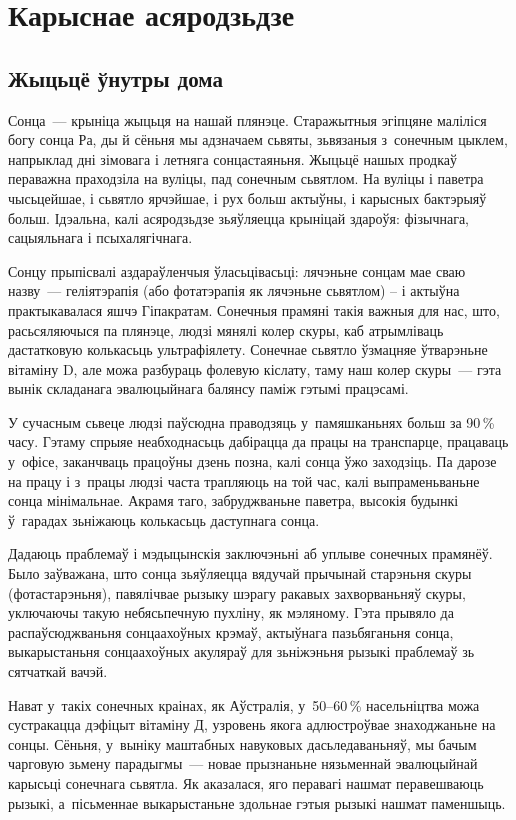 \chapter{Карыснае асяродзьдзе}

\section{Жыцьцё ўнутры дома}

Сонца~--- крыніца жыцьця на нашай плянэце. Старажытныя эгіпцяне маліліся богу сонца Ра, ды й сёньня мы адзначаем сьвяты, зьвязаныя з~сонечным цыклем, напрыклад дні зімовага і летняга сонцастаяньня. Жыцьцё нашых продкаў пераважна праходзіла на вуліцы, пад сонечным сьвятлом. На вуліцы і паветра чысьцейшае, і сьвятло ярчэйшае, і рух больш актыўны, і карысных бактэрыяў больш. Ідэальна, калі асяродзьдзе зьяўляецца крыніцай здароўя: фізычнага, сацыяльнага і псыхалягічнага.

Сонцу прыпісвалі аздараўленчыя ўласьцівасьці: лячэньне сонцам мае сваю назву~--- геліятэрапія (або фотатэрапія як лячэньне сьвятлом) -- і актыўна практыкавалася яшчэ Гіпакратам. Сонечныя прамяні такія важныя для нас, што, расьсяляючыся па плянэце, людзі мянялі колер скуры, каб атрымліваць дастатковую колькасьць ультрафіялету. Сонечнае сьвятло ўзмацняе ўтварэньне вітаміну D, але можа разбураць фолевую кіслату, таму наш колер скуры~--- гэта вынік складанага эвалюцыйнага балянсу паміж гэтымі працэсамі.

У сучасным сьвеце людзі паўсюдна праводзяць у~памяшканьнях больш за 90\,\% часу. Гэтаму спрыяе неабходнасьць дабірацца да працы на транспарце, працаваць у~офісе, заканчваць працоўны дзень позна, калі сонца ўжо заходзіць. Па дарозе на працу і з~працы людзі часта трапляюць на той час, калі выпраменьваньне сонца мінімальнае. Акрамя таго, забруджваньне паветра, высокія будынкі ў~гарадах зьніжаюць колькасьць даступнага сонца.

Дадаюць праблемаў і мэдыцынскія заключэньні аб уплыве сонечных прамянёў. Было заўважана, што сонца зьяўляецца вядучай прычынай старэньня скуры (фотастарэньня), павялічвае рызыку шэрагу ракавых захворваньняў скуры, уключаючы такую небясьпечную пухліну, як мэляному. Гэта прывяло да распаўсюджваньня сонцаахоўных крэмаў, актыўнага пазьбяганьня сонца, выкарыстаньня сонцаахоўных акуляраў для зьніжэньня рызыкі праблемаў зь сятчаткай вачэй.

Нават у~такіх сонечных краінах, як Аўстралія, у~50--60\,\% насельніцтва можа сустракацца дэфіцыт вітаміну Д, узровень якога адлюстроўвае знаходжаньне на сонцы. Сёньня, у~выніку маштабных навуковых дасьледаваньняў, мы бачым чарговую зьмену парадыгмы~--- новае прызнаньне нязьменнай эвалюцыйнай карысьці сонечнага сьвятла. Як аказалася, яго перавагі нашмат перавешваюць рызыкі, а~пісьменнае выкарыстаньне здольнае гэтыя рызыкі нашмат паменшыць. 


